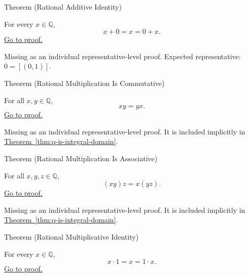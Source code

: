 \begin{theorembox}{Theorem (Rational Additive Identity)}
\begin{theorem}
\label{thm:rational-additive-identity}
For every $x\in\mathbb{Q}$,
\[
x+0=x=0+x.
\]
\hyperref[prf:rational-additive-identity]{Go to proof.}
\end{theorem}
\end{theorembox}

\begin{remark*}[Status]
Missing as an individual representative-level proof. Expected representative: $0=[(0,1)]$.
\end{remark*}

\begin{theorembox}{Theorem (Rational Multiplication Is Commutative)}
\begin{theorem}
\label{thm:rational-multiplication-commutative}
For all $x,y\in\mathbb{Q}$,
\[
xy=yx.
\]
\hyperref[prf:rational-multiplication-commutative]{Go to proof.}
\end{theorem}
\end{theorembox}

\begin{remark*}[Status]
Missing as an individual representative-level proof. It is included implicitly in \hyperref[thm:q-is-integral-domain]{Theorem~\ref*{thm:q-is-integral-domain}}.
\end{remark*}

\begin{theorembox}{Theorem (Rational Multiplication Is Associative)}
\begin{theorem}
\label{thm:rational-multiplication-associative}
For all $x,y,z\in\mathbb{Q}$,
\[
(xy)z=x(yz).
\]
\hyperref[prf:rational-multiplication-associative]{Go to proof.}
\end{theorem}
\end{theorembox}

\begin{remark*}[Status]
Missing as an individual representative-level proof. It is included implicitly in \hyperref[thm:q-is-integral-domain]{Theorem~\ref*{thm:q-is-integral-domain}}.
\end{remark*}

\begin{theorembox}{Theorem (Rational Multiplicative Identity)}
\begin{theorem}
\label{thm:rational-multiplicative-identity}
For every $x\in\mathbb{Q}$,
\[
x\cdot 1=x=1\cdot x.
\]
\hyperref[prf:rational-multiplicative-identity]{Go to proof.}
\end{theorem}
\end{theorembox}

